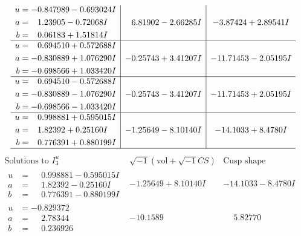 \documentclass[1p]{elsarticle_modified}
\theoremstyle{definition}
\newcommand{\I}{\sqrt{-1}}
\begin{document}
$$\begin{array}{c|c|c}
\begin{aligned}
u &= -0.847989 - 0.693024 I \\
a &= \phantom{-}1.23905 - 0.72068 I \\
b &= \phantom{-}0.06183 + 1.51814 I\end{aligned}
 & \phantom{-}6.81902 - 2.66285 I & -3.87424 + 2.89541 I \\ \hline\begin{aligned}
u &= \phantom{-}0.694510 + 0.572688 I \\
a &= -0.830889 + 1.076290 I \\
b &= -0.698566 + 1.033420 I\end{aligned}
 & -0.25743 + 3.41207 I & -11.71453 - 2.05195 I \\ \hline\begin{aligned}
u &= \phantom{-}0.694510 - 0.572688 I \\
a &= -0.830889 - 1.076290 I \\
b &= -0.698566 - 1.033420 I\end{aligned}
 & -0.25743 - 3.41207 I & -11.71453 + 2.05195 I \\ \hline\begin{aligned}
u &= \phantom{-}0.998881 + 0.595015 I \\
a &= \phantom{-}1.82392 + 0.25160 I \\
b &= \phantom{-}0.776391 + 0.880199 I\end{aligned}
 & -1.25649 - 8.10140 I & -14.1033 + 8.4780 I\\
 \hline 
 \end{array}$$\newpage$$\begin{array}{c|c|c}  
\text{Solutions to }I^u_{3}& \I (\text{vol} + \sqrt{-1}CS) & \text{Cusp shape}\\
 \hline 
\begin{aligned}
u &= \phantom{-}0.998881 - 0.595015 I \\
a &= \phantom{-}1.82392 - 0.25160 I \\
b &= \phantom{-}0.776391 - 0.880199 I\end{aligned}
 & -1.25649 + 8.10140 I & -14.1033 - 8.4780 I \\ \hline\begin{aligned}
u &= -0.829372\phantom{ +0.000000I} \\
a &= \phantom{-}2.78344\phantom{ +0.000000I} \\
b &= \phantom{-}0.236926\phantom{ +0.000000I}\end{aligned}
 & -10.1589\phantom{ +0.000000I} & \phantom{-}5.82770\phantom{ +0.000000I} \\ \hline\begin{aligned}

\end{aligned}
\end{array}$$
\end{document}
